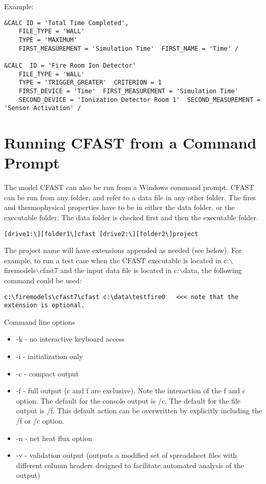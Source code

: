 \vspace{\baselineskip}
\noindent Example:
\begin{lstlisting}
&CALC ID = 'Total Time Completed',
    FILE_TYPE = 'WALL'
	TYPE = 'MAXIMUM'
	FIRST_MEASUREMENT = 'Simulation Time'  FIRST_NAME = 'Time' /

&CALC  ID = 'Fire Room Ion Detector'
    FILE_TYPE = 'WALL'
    TYPE = 'TRIGGER_GREATER'  CRITERION = 1
    FIRST_DEVICE = 'Time'  FIRST_MEASUREMENT = 'Simulation Time'
    SECOND_DEVICE = 'Ionization Detector Room 1'  SECOND_MEASUREMENT = 'Sensor Activation' /
\end{lstlisting}

\clearpage



\chapter{Running CFAST from a Command Prompt}

The model CFAST can also be run from a Windows command prompt.  CFAST can be run from any folder, and refer to a data file in any other folder. The fires and thermophysical properties have to be in either the data folder, or the executable folder. The data folder is checked first and then the executable folder.

\begin{lstlisting}
[drive1:\][folder1\]cfast [drive2:\][folder2\]project
\end{lstlisting}

The project name will have extensions appended as needed (see below). For example, to run a test case when the CFAST executable is located in c:$\backslash$firemodels$\backslash$cfast7 and the input data file is located in c:$\backslash$data, the following command could be used:

\begin{lstlisting}
c:\firemodels\cfast7\cfast c:\data\testfire0   <<< note that the extension is optional.
\end{lstlisting}

Command line options

\begin{itemize}
\item -k - no interactive keyboard access
\item -i - initialization only
\item -c - compact output
\item -f - full output (c and f are exclusive). Note the interaction of the f and c option. The default for the console output is /c. The default for the file output is /f. This default action can be overwritten by explicitly including the /f or /c option.
\item -n - net heat flux option
\item -v - validation output (outputs a modified set of spreadsheet files with different column headers designed to facilitate automated analysis of the output)
\end{itemize}


\label{last_page}





